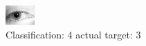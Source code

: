 \begin{figure}[h!]
\begin{center}
\includegraphics[width=0.60\columnwidth]{figures/ID1311_class_4_target_3.png}
\end{center}
\caption{ Classification: 4 actual target: 3}
\label{fig:ID1311_class_4_target_3}
\end{figure}
